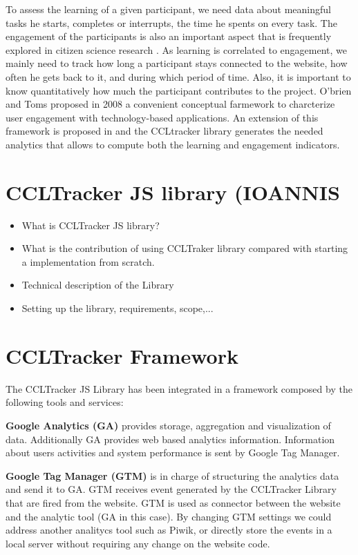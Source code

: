 \documentclass{article}
\begin{document}
To assess the learning of a given participant, we need data about meaningful tasks  he starts, completes or interrupts, the time he spents on every task. The engagement of the participants is also an important aspect that is frequently explored in  citizen science research \cite{EngProf}\cite{VolunteerEng}. As learning is correlated to engagement, we mainly need to track how long a participant stays connected to the website, how often he gets back to it, and during which period of time. Also, it is important to know quantitatively how much the participant contributes to the project. O'brien and Toms \cite{EngConcep} proposed in 2008 a convenient conceptual farmework to charcterize user engagement with technology-based applications. An extension of this framework is proposed in \cite{LAFW} and the CCLtracker library generates the needed analytics that allows to compute both the learning and engagement indicators.
 
\section{CCLTracker JS library (IOANNIS}

\begin{itemize}
\item What is CCLTracker JS library?
\item What is the contribution of using CCLTraker library compared with starting a implementation from scratch. 
\item Technical description of the Library
\item Setting up the library, requirements, scope,...

\end{itemize}


\section{CCLTracker Framework}\label{sec:CCLtrackerFramerwork}

The CCLTracker JS Library has been integrated in a framework composed by the following tools and services:

\textbf{Google Analytics (GA)} provides storage, aggregation and visualization of data. Additionally GA provides web based analytics information. Information about users activities and system performance is sent by Google Tag Manager. 

\textbf{Google Tag Manager (GTM)} is in charge of structuring the analytics data and send it to GA. GTM receives event generated by the CCLTracker Library that are fired from the website. GTM is used as connector between the website and the analytic tool (GA in this case). By changing GTM settings we could address another analitycs tool such as Piwik, or directly store the events in a local server without requiring any change on the website code. 
\end{document}
